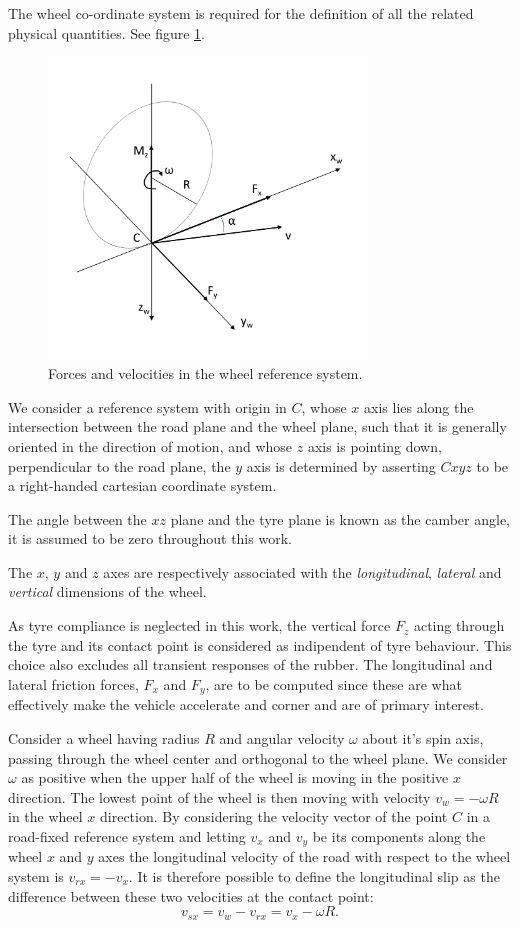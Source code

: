 The wheel co-ordinate system is required for the definition of all the related physical quantities. See figure \ref{tyresystem}.
\begin{figure}[tb]
  \centering
  \includegraphics[height = 8cm]{images/tyresystem}
  \caption{Forces and velocities in the wheel reference system.}
  \label{tyresystem}
\end{figure}

We consider a reference system with origin in $C$, whose $x$ axis lies along the intersection between the road plane and the wheel plane, such that it is generally oriented in the direction of motion, and whose $z$ axis is pointing down, perpendicular to the road plane, the $y$ axis is determined by asserting $Cxyz$ to be a right-handed cartesian coordinate system.

The angle between the $xz$ plane and the tyre plane is known as the camber angle, it is assumed to be zero throughout this work.

The $x$, $y$ and $z$ axes are respectively associated with the \textit{longitudinal}, \textit{lateral} and \textit{vertical} dimensions of the wheel.

As tyre compliance is neglected in this work, the vertical force $F_z$ acting through the tyre and its contact point is considered as indipendent of tyre behaviour. This choice also excludes all transient responses of the rubber. The longitudinal and lateral friction forces, $F_x$ and $F_y$, are to be computed since these are what effectively make the vehicle accelerate and corner and are of primary interest.

Consider a wheel having radius $R$ and angular velocity $\omega$ about it's spin axis, passing through the wheel center and orthogonal to the wheel plane.
We consider $\omega$ as positive when the upper half of the wheel is moving in the positive $x$ direction. The lowest point of the wheel is then moving with velocity $v_{w} = -\omega R$ in the wheel $x$ direction.
By considering the velocity vector of the point $C$ in a road-fixed reference system and letting $v_x$ and $v_y$ be its components along the wheel $x$ and $y$ axes the longitudinal velocity of the road with respect to the wheel system is $v_{rx} = - v_x$.
It is therefore possible to define the longitudinal slip as the difference between these two velocities at the contact point:
$$v_{sx} = v_{w} - v_{rx} = v_x - \omega R .$$

